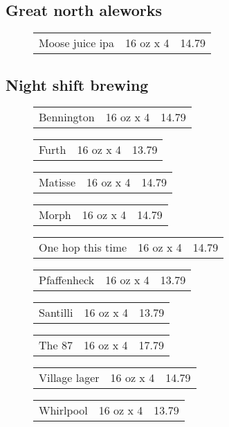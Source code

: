 \documentclass{article}%
\begin{document}
\begin{multicols}{3}
%
\subsection*{Great north aleworks}%
\begin{description}%
\item[]%
\begin{tabular}{l c r}%
Moose juice ipa&16 oz x 4&14.79\\%
\end{tabular}%
\end{description}

%
\subsection*{Night shift brewing}%
\begin{description}%
\item[]%
\begin{tabular}{l c r}%
Bennington&16 oz x 4&14.79\\%
\end{tabular}%
\item[]%
\begin{tabular}{l c r}%
Furth&16 oz x 4&13.79\\%
\end{tabular}%
\item[]%
\begin{tabular}{l c r}%
Matisse&16 oz x 4&14.79\\%
\end{tabular}%
\item[]%
\begin{tabular}{l c r}%
Morph&16 oz x 4&14.79\\%
\end{tabular}%
\item[]%
\begin{tabular}{l c r}%
One hop this time&16 oz x 4&14.79\\%
\end{tabular}%
\item[]%
\begin{tabular}{l c r}%
Pfaffenheck&16 oz x 4&13.79\\%
\end{tabular}%
\item[]%
\begin{tabular}{l c r}%
Santilli&16 oz x 4&13.79\\%
\end{tabular}%
\item[]%
\begin{tabular}{l c r}%
The 87&16 oz x 4&17.79\\%
\end{tabular}%
\item[]%
\begin{tabular}{l c r}%
Village lager&16 oz x 4&14.79\\%
\end{tabular}%
\item[]%
\begin{tabular}{l c r}%
Whirlpool&16 oz x 4&13.79\\%
\end{tabular}%
\end{description}


\end{multicols}
\end{document}
